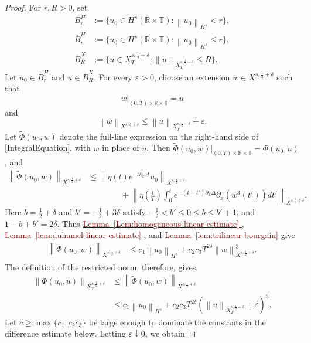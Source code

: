 \documentclass[12pt,oneside,reqno]{amsart}
\newcommand{\lemref}[1]{%
    \hyperref[#1]{%
        \textcolor{Maroon}{Lemma~\ref*{#1}}%
    }%
}
\numberwithin{equation}{section}
\theoremstyle{plain}
\def\R{{\mathbb R}}
\def\T{{\mathbb T}}
\newcommand{\norm}[1]{%
    \left\lVert #1\right\rVert%
}
\def\pt{\partial}
\newcommand{\Hnxy}[3]{%
    \left\lVert #1\right\rVert_{H^{#2}_{#3}}%
}
\newcommand{\xnorm}[3]{%
    \left\lVert #1\right\rVert_{X^{{#2},{#3}}}%
}
\newcommand{\xtnorm}[3]{%
    \left\lVert #1\right\rVert_{X^{{#2},{#3}}_T}%
}
\newcommand{\rt}{\R\times\T}
\begin{document}
\begin{proof}
For $r,R>0$, set
\begin{equation*}
\begin{aligned}
    B_r^H
    &:=\{u_0\in H^s(\rt):\norm{u_0}_{H^s}<r\},
    \\
    \overline B_r^H
    &:=\{u_0\in H^s(\rt):\norm{u_0}_{H^s}\leq r\},
    \\
    \overline B_R^X
    &:=\{u\in X_T^{s,\frac12+\delta}:
        \xtnorm{u}{s}{\frac12+\delta}\leq R\}.
\end{aligned}
\end{equation*}
Let $u_0\in\overline B_r^H$ and $u\in\overline B_R^X$. For every
$\varepsilon>0$, choose an extension $w\in X^{s,\frac12+\delta}$ such that
\begin{equation}
    w|_{(0,T)\times\rt}=u
\end{equation}
and
\begin{equation}
    \norm{w}_{X^{s,\frac12+\delta}}
    \leq
    \norm{u}_{X_T^{s,\frac12+\delta}}
    +\varepsilon.
\end{equation}
Let $\widetilde\Phi(u_0,w)$ denote the full-line expression on the right-hand
side of \eqref{IntegralEquation}, with $w$ in place of $u$. Then
$\widetilde\Phi(u_0,w)|_{(0,T)\times\rt}=\Phi(u_0,u)$, and
\begin{align*}
     \xnorm{\widetilde\Phi(u_0,w)}{s}{\frac{1}{2}+\delta}& \leq  \xnorm{ \eta(t)     e^{- t \pt_x \Delta} u_0 }{s}{\frac{1}{2}+\delta}\\
     &\qquad \qquad +  \xnorm{   \eta(\frac{t}{T}) \int_0^t e^{- (t-t') \pt_x \Delta} \pt_x (w^3 (t')) dt'}{s}{\frac{1}{2}+\delta}.
\end{align*}
Here $b=\frac12+\delta$ and $b'=-\frac12+3\delta$ satisfy
$-\frac12<b'\leq0\leq b\leq b'+1$, and
$1-b+b'=2\delta$. Thus
\lemref{Lem:homogeneous-linear-estimate},
\lemref{lem:duhamel-linear-estimate}, and
\lemref{lem:trilinear-bourgain} give
\begin{align*}
      \xnorm{\widetilde\Phi(u_0,w)}{s}{\frac12+\delta}
      &\leq c_1\Hnxy{u_0}{s}{}
      +c_2c_3T^{2\delta}\xnorm{w}{s}{\frac12+\delta}^3.
\end{align*}
The definition of the restricted norm, therefore, gives
\begin{align*}
\xtnorm{\Phi(u_0,u)}{s}{\frac12+\delta}
&\leq
\xnorm{\widetilde\Phi(u_0,w)}{s}{\frac12+\delta}
\\
&\leq
c_1\Hnxy{u_0}{s}{}
+
c_2c_3T^{2\delta}
\left(
    \xtnorm{u}{s}{\frac12+\delta}
    +\varepsilon
\right)^3.
\end{align*}
Let $c\geq\max\{c_1,c_2c_3\}$ be large enough to dominate the constants in the difference estimate below. Letting $\varepsilon\downarrow0$, we obtain

\end{proof}
\end{document}
